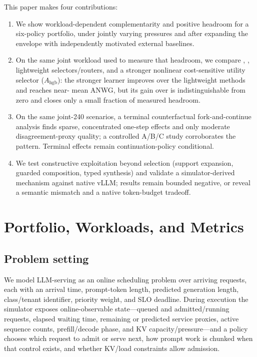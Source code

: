 \documentclass[runningheads]{llncs}
\begin{document}
This paper makes four contributions:
\begin{enumerate}
  \item We show workload-dependent complementarity and positive \vbs{} headroom
  for a six-policy portfolio, under jointly varying pressures and after
  expanding the envelope with independently motivated external baselines.
  \item On the same joint workload used to measure that headroom, we compare
  \sbs{}, \vbs{}, lightweight selectors/routers, and a stronger nonlinear
  cost-sensitive utility selector ($A_{\mathrm{hgb}}$): the stronger learner
  improves over the lightweight methods and reaches near-\sbs{} mean ANWG,
  but its gain over \sbs{} is indistinguishable from zero and closes only a
  small fraction of measured \vbs{} headroom.
  \item On the same joint-240 scenarios, a terminal counterfactual
  fork-and-continue analysis finds sparse, concentrated one-step effects and
  only moderate disagreement-proxy quality; a controlled A/B/C study
  corroborates the pattern. Terminal effects remain continuation-policy
  conditional.
  \item We test constructive exploitation beyond selection (support expansion,
  guarded composition, typed synthesis) and validate a simulator-derived
  mechanism against native vLLM; results remain bounded negative, or reveal a
  semantic mismatch and a native token-budget tradeoff.
\end{enumerate}

\section{Portfolio, Workloads, and Metrics}
\label{sec:methods}

\subsection{Problem setting}

We model LLM-serving as an online scheduling problem over arriving requests,
each with an arrival time, prompt-token length, predicted generation length,
class/tenant identifier, priority weight, and SLO deadline. During execution
the simulator exposes online-observable state---queued and admitted/running
requests, elapsed waiting time, remaining or predicted service proxies, active
sequence counts, prefill/decode phase, and KV capacity/pressure---and a policy
chooses which request to admit or serve next, how prompt work is chunked when
that control exists, and whether KV/load constraints allow admission.
\end{document}
